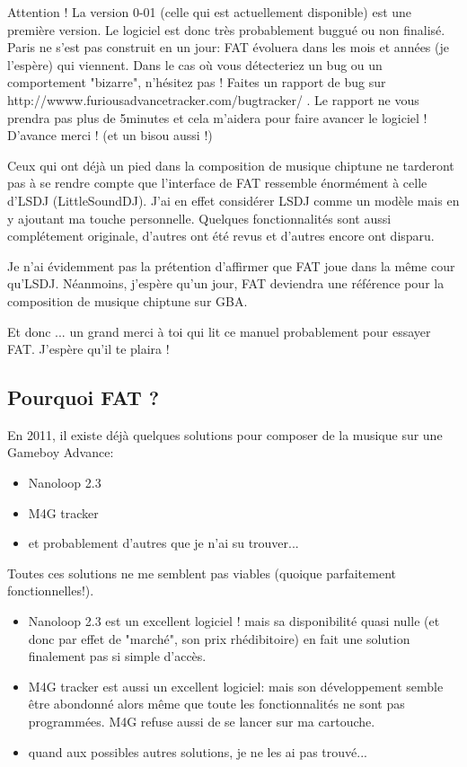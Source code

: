 \documentclass[12pt,a4paper]{article}
\begin{document}
    Attention ! La version 0-01 (celle qui est actuellement disponible) est une première version. Le logiciel est donc très probablement buggué ou non finalisé. Paris ne s'est pas construit en un jour: FAT évoluera dans les mois et années (je l'espère) qui viennent. Dans le cas où vous détecteriez un bug ou un comportement "bizarre", n'hésitez pas ! Faites un rapport de bug sur http://wwww.furiousadvancetracker.com/bugtracker/ . Le rapport ne vous prendra pas plus de 5minutes et cela m'aidera pour faire avancer le logiciel ! D'avance merci ! (et un bisou aussi !)\medskip
    
    Ceux qui ont déjà un pied dans la composition de musique chiptune ne tarderont pas à se rendre compte que l'interface de FAT ressemble énormément à celle d'LSDJ (LittleSoundDJ). J'ai en effet considérer LSDJ comme un modèle mais en y ajoutant ma touche personnelle. Quelques fonctionnalités sont aussi complétement originale, d'autres ont été revus et d'autres encore ont disparu.\medskip
    
    Je n'ai évidemment pas la prétention d'affirmer que FAT joue dans la même cour qu'LSDJ. Néanmoins, j'espère qu'un jour, FAT deviendra une référence pour la composition de musique chiptune sur GBA.\medskip
    
    Et donc ... un grand merci à toi qui lit ce manuel probablement pour essayer FAT. J'espère qu'il te plaira !
  
    \subsection{Pourquoi FAT ?}
    En 2011, il existe déjà quelques solutions pour composer de la musique sur une Gameboy Advance:
    
    \begin{itemize}
        \item{Nanoloop 2.3}
        \item{M4G tracker}
        \item{et probablement d'autres que je n'ai su trouver...}
    \end{itemize}\medskip
    
    Toutes ces solutions ne me semblent pas viables (quoique parfaitement fonctionnelles!).
    
    \begin{itemize}
        \item{Nanoloop 2.3 est un excellent logiciel ! mais sa disponibilité quasi nulle (et donc par effet de "marché", son prix rhédibitoire) en fait une solution finalement pas si simple d'accès.}
        \item{M4G tracker est aussi un excellent logiciel: mais son développement semble être abondonné alors même que toute les fonctionnalités ne sont pas programmées. M4G refuse aussi de se lancer sur ma cartouche.}
        \item{quand aux possibles autres solutions, je ne les ai pas trouvé...}
    \end{itemize}\medskip
    
\end{document}
